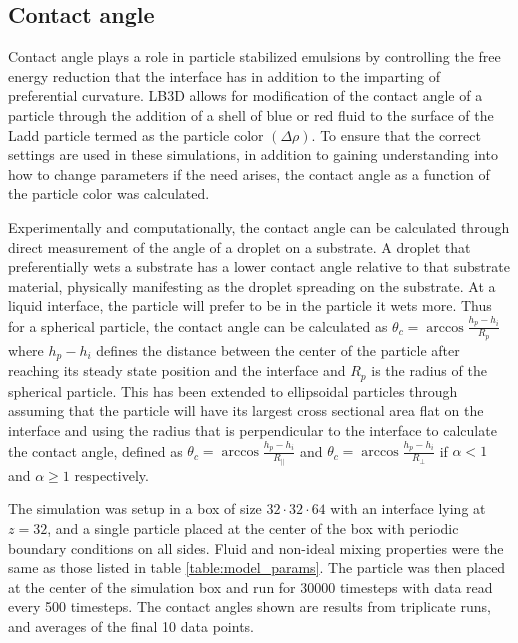 \subsection{Contact angle}
\label{section:model_contact_angle}

Contact angle plays a role in particle stabilized emulsions by controlling the free energy reduction that the interface 
has in addition to the imparting of preferential curvature. LB3D allows for modification of the contact angle of a 
particle through the addition of a shell of blue or red fluid to the surface of the Ladd particle termed as the particle 
color $(\Delta \rho)$. \cite{jansen_bijels_2011, gunther_lattice_2013} To ensure that the correct settings are used in 
these simulations, in addition to gaining understanding into how to change parameters if the need arises, the contact 
angle as a function of the particle color was calculated.

Experimentally and computationally, the contact angle can be calculated through direct measurement of the angle of a 
droplet on a substrate. A droplet that preferentially wets a substrate has a lower contact angle relative to that 
substrate material, physically manifesting as the droplet spreading on the substrate. At a liquid interface, the particle 
will prefer to be in the particle it wets more. Thus for a spherical particle, the contact angle can be calculated as 
$\theta_c = \arccos{\frac{h_p - h_i}{R_p}}$ where $h_p - h_i$ defines the distance between the center of the particle 
after reaching its steady state position and the interface and $R_p$ is the radius of the spherical particle. 
\cite{gunther_lattice_2013, davies_interface_2014} This has been extended to ellipsoidal particles through assuming 
that the particle will have its largest cross sectional area flat on the interface and using the radius that is 
perpendicular to the interface to calculate the contact angle, defined as $\theta_c = \arccos{\frac{h_p - h_i}{R_{\parallel}}}$ 
and $\theta_c = \arccos{\frac{h_p - h_i}{R_{\perp}}}$ if $\alpha < 1$ and $\alpha \geq 1$ respectively. 

The simulation was setup in a box of size $32\cdot32\cdot64$ with an interface lying at $z = 32$, and a single particle 
placed at the center of the box with periodic boundary conditions on all sides. Fluid and non-ideal mixing properties were 
the same as those listed in table \ref{table:model_params}. The particle was then placed at the center of the simulation 
box and run for $30000$ timesteps with data read every 500 timesteps. The contact angles shown are results from triplicate 
runs, and averages of the final 10 data points. 

